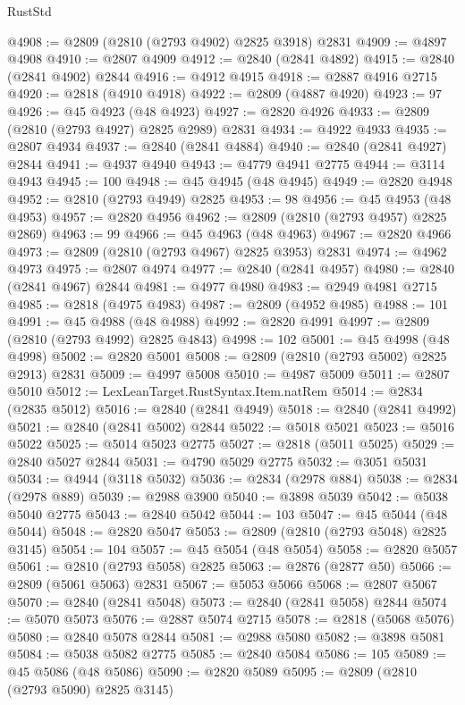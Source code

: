 \begin{lexlean}{RustStd}
\begin{coremodule}
@4908 := @2809 (@2810 (@2793 @4902) @2825 @3918) @2831
@4909 := @4897 @4908
@4910 := @2807 @4909
@4912 := @2840 (@2841 @4892)
@4915 := @2840 (@2841 @4902) @2844
@4916 := @4912 @4915
@4918 := @2887 @4916 @2715
@4920 := @2818 (@4910 @4918)
@4922 := @2809 (@4887 @4920)
@4923 := 97
@4926 := @45 @4923 (@48 @4923)
@4927 := @2820 @4926
@4933 := @2809 (@2810 (@2793 @4927) @2825 @2989) @2831
@4934 := @4922 @4933
@4935 := @2807 @4934
@4937 := @2840 (@2841 @4884)
@4940 := @2840 (@2841 @4927) @2844
@4941 := @4937 @4940
@4943 := @4779 @4941 @2775
@4944 := @3114 @4943
@4945 := 100
@4948 := @45 @4945 (@48 @4945)
@4949 := @2820 @4948
@4952 := @2810 (@2793 @4949) @2825
@4953 := 98
@4956 := @45 @4953 (@48 @4953)
@4957 := @2820 @4956
@4962 := @2809 (@2810 (@2793 @4957) @2825 @2869)
@4963 := 99
@4966 := @45 @4963 (@48 @4963)
@4967 := @2820 @4966
@4973 := @2809 (@2810 (@2793 @4967) @2825 @3953) @2831
@4974 := @4962 @4973
@4975 := @2807 @4974
@4977 := @2840 (@2841 @4957)
@4980 := @2840 (@2841 @4967) @2844
@4981 := @4977 @4980
@4983 := @2949 @4981 @2715
@4985 := @2818 (@4975 @4983)
@4987 := @2809 (@4952 @4985)
@4988 := 101
@4991 := @45 @4988 (@48 @4988)
@4992 := @2820 @4991
@4997 := @2809 (@2810 (@2793 @4992) @2825 @4843)
@4998 := 102
@5001 := @45 @4998 (@48 @4998)
@5002 := @2820 @5001
@5008 := @2809 (@2810 (@2793 @5002) @2825 @2913) @2831
@5009 := @4997 @5008
@5010 := @4987 @5009
@5011 := @2807 @5010
@5012 := LexLeanTarget.RustSyntax.Item.natRem
@5014 := @2834 (@2835 @5012)
@5016 := @2840 (@2841 @4949)
@5018 := @2840 (@2841 @4992)
@5021 := @2840 (@2841 @5002) @2844
@5022 := @5018 @5021
@5023 := @5016 @5022
@5025 := @5014 @5023 @2775
@5027 := @2818 (@5011 @5025)
@5029 := @2840 @5027 @2844
@5031 := @4790 @5029 @2775
@5032 := @3051 @5031
@5034 := @4944 (@3118 @5032)
@5036 := @2834 (@2978 @884)
@5038 := @2834 (@2978 @889)
@5039 := @2988 @3900
@5040 := @3898 @5039
@5042 := @5038 @5040 @2775
@5043 := @2840 @5042
@5044 := 103
@5047 := @45 @5044 (@48 @5044)
@5048 := @2820 @5047
@5053 := @2809 (@2810 (@2793 @5048) @2825 @3145)
@5054 := 104
@5057 := @45 @5054 (@48 @5054)
@5058 := @2820 @5057
@5061 := @2810 (@2793 @5058) @2825
@5063 := @2876 (@2877 @50)
@5066 := @2809 (@5061 @5063) @2831
@5067 := @5053 @5066
@5068 := @2807 @5067
@5070 := @2840 (@2841 @5048)
@5073 := @2840 (@2841 @5058) @2844
@5074 := @5070 @5073
@5076 := @2887 @5074 @2715
@5078 := @2818 (@5068 @5076)
@5080 := @2840 @5078 @2844
@5081 := @2988 @5080
@5082 := @3898 @5081
@5084 := @5038 @5082 @2775
@5085 := @2840 @5084
@5086 := 105
@5089 := @45 @5086 (@48 @5086)
@5090 := @2820 @5089
@5095 := @2809 (@2810 (@2793 @5090) @2825 @3145)

\end{coremodule}
\end{lexlean}
